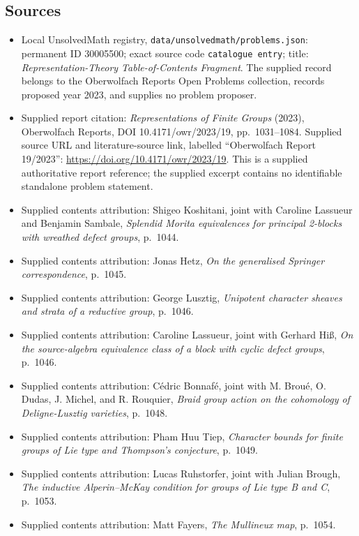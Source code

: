 \documentclass[11pt]{article}
\begin{document}
\subsection{Sources}
\begin{itemize}
\item Local UnsolvedMath registry, \texttt{data/unsolvedmath/problems.json}: permanent ID 30005500; exact source code \texttt{catalogue entry}; title: \emph{Representation-Theory Table-of-Contents Fragment}. The supplied record belongs to the Oberwolfach Reports Open Problems collection, records proposed year 2023, and supplies no problem proposer.
\item Supplied report citation: \emph{Representations of Finite Groups} (2023), Oberwolfach Reports, DOI 10.4171/owr/2023/19, pp.\ 1031--1084. Supplied source URL and literature-source link, labelled ``Oberwolfach Report 19/2023'': \url{https://doi.org/10.4171/owr/2023/19}. This is a supplied authoritative report reference; the supplied excerpt contains no identifiable standalone problem statement.
\item Supplied contents attribution: Shigeo Koshitani, joint with Caroline Lassueur and Benjamin Sambale, \emph{Splendid Morita equivalences for principal 2-blocks with wreathed defect groups}, p.\ 1044.
\item Supplied contents attribution: Jonas Hetz, \emph{On the generalised Springer correspondence}, p.\ 1045.
\item Supplied contents attribution: George Lusztig, \emph{Unipotent character sheaves and strata of a reductive group}, p.\ 1046.
\item Supplied contents attribution: Caroline Lassueur, joint with Gerhard Hiß, \emph{On the source-algebra equivalence class of a block with cyclic defect groups}, p.\ 1046.
\item Supplied contents attribution: Cédric Bonnafé, joint with M. Broué, O. Dudas, J. Michel, and R. Rouquier, \emph{Braid group action on the cohomology of Deligne-Lusztig varieties}, p.\ 1048.
\item Supplied contents attribution: Pham Huu Tiep, \emph{Character bounds for finite groups of Lie type and Thompson's conjecture}, p.\ 1049.
\item Supplied contents attribution: Lucas Ruhstorfer, joint with Julian Brough, \emph{The inductive Alperin--McKay condition for groups of Lie type B and C}, p.\ 1053.
\item Supplied contents attribution: Matt Fayers, \emph{The Mullineux map}, p.\ 1054.

\end{itemize}
\end{document}
